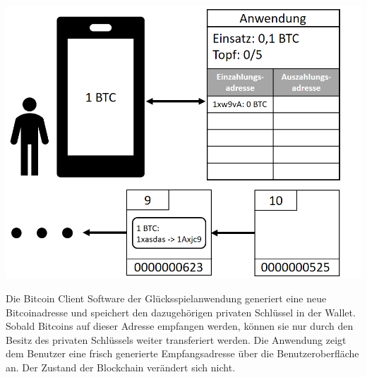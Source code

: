 \vspace{1cm}
\begin{minipage}{0.55\textwidth}
\includegraphics[width=\textwidth]{Figures/konzept_btc/konzept2}
\centering
\decoRule
{}
\end{minipage}
\begin{minipage}{0.45\textwidth}
Die Bitcoin Client Software der Glücksspielanwendung generiert eine neue Bitcoinadresse und speichert den dazugehörigen privaten Schlüssel in der Wallet. Sobald Bitcoins auf dieser Adresse empfangen werden, können sie nur durch den Besitz des privaten Schlüssels weiter transferiert werden.
Die Anwendung zeigt dem Benutzer eine frisch generierte Empfangsadresse über die Benutzeroberfläche an. Der Zustand der Blockchain verändert sich nicht.
\end{minipage}

